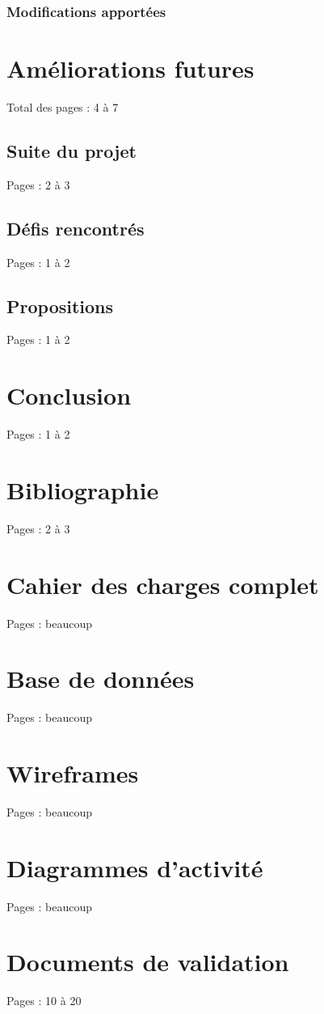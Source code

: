 \documentclass{eplmastersthesis_FR}
\begin{document}
			\subsection*{Modifications apportées}

	\chapter{Améliorations futures}

		Total des pages : 4 à 7

		\section{Suite du projet}

			Pages : 2 à 3

		\section{Défis rencontrés}

			Pages : 1 à 2

		\section{Propositions}

			Pages : 1 à 2

	\chapter{Conclusion}

		Pages : 1 à 2

	\chapter*{Bibliographie}

		Pages : 2 à 3

	\appendix

	\chapter{Cahier des charges complet}

		Pages : beaucoup

	\chapter{Base de données}

		Pages : beaucoup

	\chapter{Wireframes}

		Pages : beaucoup

	\chapter{Diagrammes d'activité}

		Pages : beaucoup

	\chapter{Documents de validation}
		Pages : 10 à 20
	\setlength{\parskip}{0em}
	\backcoverpage
\end{document}
